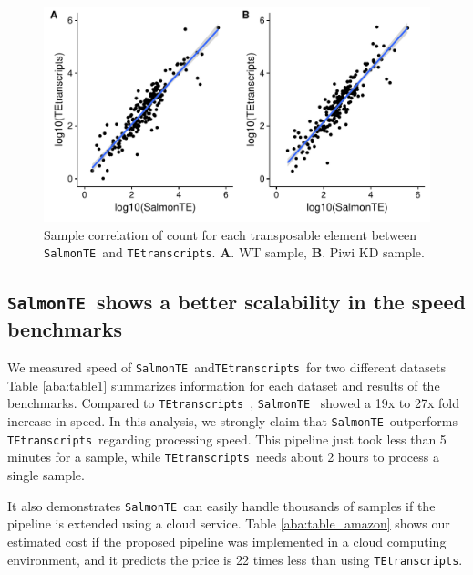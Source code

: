 \documentclass[wsdraft]{ws-procs11x85}
\newcommand{\TEtranscripts}{\texttt{TEtranscripts}}
\newcommand{\SalmonTE}{\texttt{SalmonTE}}
\begin{document}
\begin{figure}[h]
\centerline{
\includegraphics[width=13cm]{figure_corr_count}
}
\caption{Sample correlation of count for each transposable element between \SalmonTE~and \TEtranscripts. \textbf{A}. WT sample, \textbf{B}. Piwi KD sample.}
\label{aba:fig3}
\end{figure}



\subsection{\SalmonTE~shows a better scalability in the speed benchmarks}
We measured speed of \SalmonTE~and\TEtranscripts~for two different datasets Table \ref{aba:table1} summarizes information for each dataset and results of the benchmarks.
Compared to \TEtranscripts~,  \SalmonTE~ showed a 19x to 27x fold increase in speed.
In this analysis, we strongly claim that \SalmonTE~outperforms \TEtranscripts~regarding processing speed. This pipeline just took less than 5 minutes for a sample, while \TEtranscripts~needs about 2 hours to process a single sample. 

It also demonstrates \SalmonTE~can easily handle thousands of samples if the pipeline is extended using a cloud service. 
Table \ref{aba:table_amazon} shows our estimated cost if the proposed pipeline was implemented in a cloud computing environment, and it predicts the price is 22 times less than using \TEtranscripts.  
\end{document}
